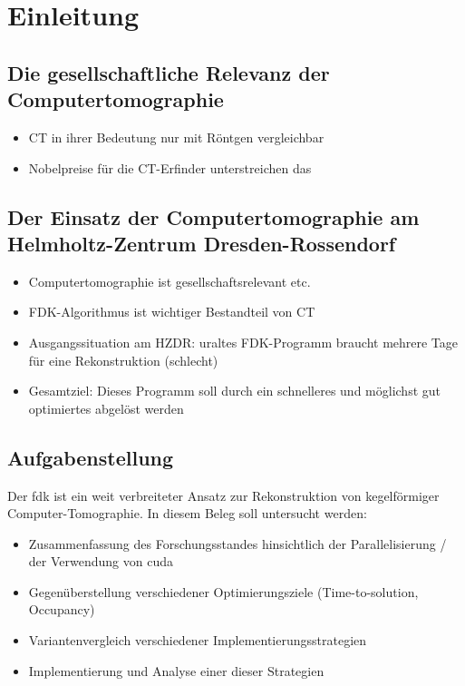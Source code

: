 \chapter{Einleitung}

\section{Die gesellschaftliche Relevanz der Computertomographie}

\begin{itemize}
    \item CT in ihrer Bedeutung nur mit Röntgen vergleichbar
    \item Nobelpreise für die CT-Erfinder unterstreichen das
\end{itemize}

\section{Der Einsatz der Computertomographie am Helmholtz-Zentrum Dresden-Rossendorf}

\begin{itemize}
    \item Computertomographie ist gesellschaftsrelevant etc.
    \item FDK-Algorithmus ist wichtiger Bestandteil von CT
    \item Ausgangssituation am HZDR: uraltes FDK-Programm braucht mehrere Tage für eine Rekonstruktion (schlecht)
    \item Gesamtziel: Dieses Programm soll durch ein schnelleres und möglichst gut optimiertes abgelöst werden
\end{itemize}

\section{Aufgabenstellung}

Der \gls{fdk} ist ein weit verbreiteter Ansatz zur Rekonstruktion von kegelförmiger Computer-Tomographie. In diesem
Beleg soll untersucht werden:

\begin{itemize}
    \item Zusammenfassung des Forschungsstandes hinsichtlich der Parallelisierung / der Verwendung von \gls{cuda}
    \item Gegenüberstellung verschiedener Optimierungsziele (Time-to-solution, Occupancy)
    \item Variantenvergleich verschiedener Implementierungsstrategien
    \item Implementierung und Analyse einer dieser Strategien
\end{itemize}
